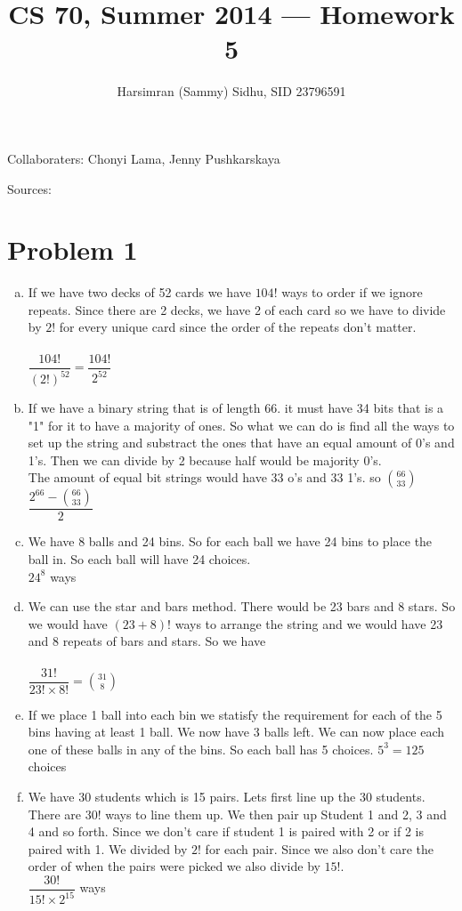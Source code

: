 \documentclass[11pt,letterpaper]{article}
\title{CS 70, Summer 2014 --- Homework 5} %
\author{Harsimran (Sammy) Sidhu, SID 23796591} %
\begin{document}
\maketitle

Collaboraters: Chonyi Lama, Jenny Pushkarskaya

Sources: 

\section*{Problem 1} %

\begin{enumerate}[(a)]
\item
If we have two decks of 52 cards we have $104!$ ways to order if we ignore repeats. Since there are 2 decks, we have 2 of each card so we have to divide by $2!$ for every unique card since the order of the repeats don't matter.\\\\
$\dfrac{104!}{(2!)^{52}} = \dfrac{104!}{2^{52}}$\\
\item
If we have a binary string that is of length 66. it must have 34 bits that is a "1" for it to have a majority of ones. So what we can do is find all the ways to set up the string and substract the ones that have an equal amount of 0's and 1's. Then we can divide by 2 because half would be majority 0's.\\
The amount of equal bit strings would have 33 o's and 33 1's. so ${66\choose 33}$ \\
$\dfrac{2^{66} - {66\choose 33}}{2}$
\item
We have 8 balls and 24 bins. So for each ball we have 24 bins to place the ball in. So each ball will have 24 choices.\\
$24^8$ ways
\item
We can use the star and bars method. There would be 23 bars and 8 stars. So we would have
${(23+8)!}$ ways to arrange the string and we would have 23 and 8 repeats of bars and stars. So we have\\\\
$\dfrac{31!}{23!\times8!} = {31\choose 8}$
\clearpage
\item
If we place 1 ball into each bin we statisfy the requirement for each of the 5 bins having at least 1 ball. We now have 3 balls left. We can now place each one of these balls in any of the bins. So each ball has 5 choices.
$5^3=125$ choices 
\item
We have 30 students which is 15 pairs. Lets first line up the 30 students. There are $30!$ ways to line them up. We then pair up Student 1 and 2, 3 and 4 and so forth. Since we don't care if student 1 is paired with 2 or if 2 is paired with 1. We divided by $2!$ for each pair. Since we also don't care the order of when the pairs were picked we also divide by $15!$.\\
$\dfrac{30!}{15!\times 2^{15}}$ ways
\end{enumerate}
\clearpage
\end{document}
